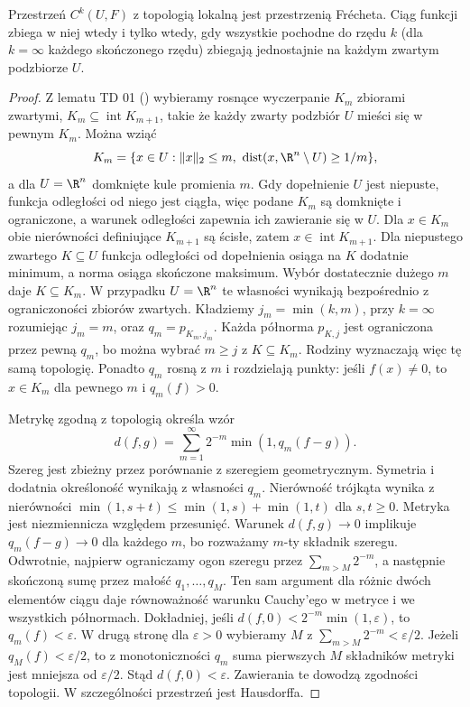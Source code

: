 \begin{twierdzenie}
\label{ma2:thm:ck-local-frechet}
Przestrzeń $C^k(U,F)$ z topologią lokalną
jest przestrzenią Frécheta. Ciąg funkcji zbiega
w niej wtedy i tylko wtedy, gdy wszystkie
pochodne do rzędu $k$ (dla $k=\infty$ każdego
skończonego rzędu) zbiegają jednostajnie
na każdym zwartym podzbiorze $U$.
\end{twierdzenie}
\begin{proof}
Z lematu TD 01 ()
wybieramy rosnące wyczerpanie $K_m$ zbiorami
zwartymi, $K_m\subseteq\operatorname{int}K_{m+1}$,
takie że każdy zwarty podzbiór $U$ mieści się
w pewnym $K_m$. Można wziąć
\[
 K_m=\{x\in U:\|x\|_2\le m,\
       \operatorname{dist}(x,\R^n\setminus U)\ge1/m\},
\]
a dla $U=\R^n$ domknięte kule promienia $m$.
Gdy dopełnienie $U$ jest niepuste, funkcja odległości od niego
jest ciągła, więc podane $K_m$ są domknięte i ograniczone,
a warunek odległości zapewnia ich zawieranie się w $U$.
Dla $x\in K_m$ obie nierówności definiujące $K_{m+1}$
są ścisłe, zatem $x\in\operatorname{int}K_{m+1}$.
Dla niepustego zwartego $K\subseteq U$ funkcja odległości
od dopełnienia osiąga na $K$ dodatnie minimum, a norma
osiąga skończone maksimum. Wybór dostatecznie dużego $m$
daje $K\subseteq K_m$. W przypadku $U=\R^n$ te własności
wynikają bezpośrednio z ograniczoności zbiorów zwartych.
Kładziemy $j_m=\min(k,m)$, przy $k=\infty$
rozumiejąc $j_m=m$, oraz $q_m=p_{K_m,j_m}$.
Każda półnorma $p_{K,j}$ jest ograniczona
przez pewną $q_m$, bo można wybrać $m\ge j$
z $K\subseteq K_m$. Rodziny wyznaczają więc
tę samą topologię. Ponadto $q_m$ rosną z $m$
i rozdzielają punkty: jeśli $f(x)\ne0$, to
$x\in K_m$ dla pewnego $m$ i $q_m(f)>0$.

Metrykę zgodną z topologią określa wzór
\[
 d(f,g)=\sum_{m=1}^{\infty}2^{-m}
                        \min(1,q_m(f-g)).
\]
Szereg jest zbieżny przez porównanie z szeregiem
geometrycznym. Symetria i dodatnia określoność
wynikają z własności $q_m$. Nierówność trójkąta
wynika z nierówności
$\min(1,s+t)\le\min(1,s)+\min(1,t)$ dla
$s,t\ge0$. Metryka jest niezmiennicza
względem przesunięć. Warunek $d(f,g)\to0$
implikuje $q_m(f-g)\to0$ dla każdego $m$,
bo rozważamy $m$-ty składnik szeregu.
Odwrotnie, najpierw ograniczamy ogon szeregu
przez $\sum_{m>M}2^{-m}$, a następnie skończoną
sumę przez małość $q_1,\ldots,q_M$.
Ten sam argument dla różnic dwóch elementów
ciągu daje równoważność warunku Cauchy'ego
w metryce i we wszystkich półnormach.
Dokładniej, jeśli $d(f,0)<2^{-m}\min(1,\varepsilon)$,
to $q_m(f)<\varepsilon$. W drugą stronę
dla $\varepsilon>0$ wybieramy $M$ z
$\sum_{m>M}2^{-m}<\varepsilon/2$.
Jeżeli $q_M(f)<\varepsilon/2$, to z monotoniczności
$q_m$ suma pierwszych $M$ składników metryki
jest mniejsza od $\varepsilon/2$.
Stąd $d(f,0)<\varepsilon$.
Zawierania te dowodzą zgodności topologii.
W szczególności przestrzeń jest Hausdorffa.


\end{proof}
